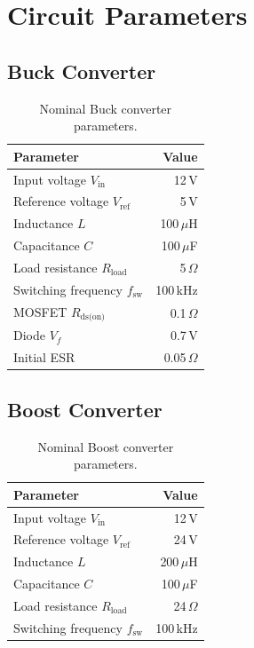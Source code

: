 \documentclass[11pt]{article}
\begin{document}
\section{Circuit Parameters}

\subsection{Buck Converter}

\begin{table}[h]
\centering
\caption{Nominal Buck converter parameters.}
\begin{tabular}{lr}
\toprule
\textbf{Parameter} & \textbf{Value} \\
\midrule
Input voltage $V_{\text{in}}$ & 12\,V \\
Reference voltage $V_{\text{ref}}$ & 5\,V \\
Inductance $L$ & 100\,$\mu$H \\
Capacitance $C$ & 100\,$\mu$F \\
Load resistance $R_{\text{load}}$ & 5\,$\Omega$ \\
Switching frequency $f_{\text{sw}}$ & 100\,kHz \\
MOSFET $R_{\text{ds(on)}}$ & 0.1\,$\Omega$ \\
Diode $V_f$ & 0.7\,V \\
Initial ESR & 0.05\,$\Omega$ \\
\bottomrule
\end{tabular}
\end{table}

\subsection{Boost Converter}

\begin{table}[h]
\centering
\caption{Nominal Boost converter parameters.}
\begin{tabular}{lr}
\toprule
\textbf{Parameter} & \textbf{Value} \\
\midrule
Input voltage $V_{\text{in}}$ & 12\,V \\
Reference voltage $V_{\text{ref}}$ & 24\,V \\
Inductance $L$ & 200\,$\mu$H \\
Capacitance $C$ & 100\,$\mu$F \\
Load resistance $R_{\text{load}}$ & 24\,$\Omega$ \\
Switching frequency $f_{\text{sw}}$ & 100\,kHz \\
\bottomrule
\end{tabular}
\end{table}
\end{document}
